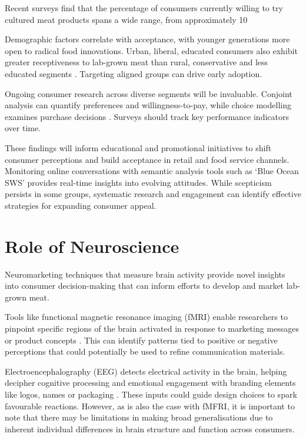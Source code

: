 \documentclass[10pt]{article}
\begin{document}
\begin{sloppypar}
  Recent surveys find that the percentage of consumers currently willing to try cultured meat products spans a wide range, from approximately 10%

  Demographic factors correlate with acceptance, with younger generations more open to radical food innovations. Urban, liberal, educated consumers also exhibit greater receptiveness to lab-grown meat than rural, conservative and less educated segments \citep{circus_exploring_2018}. Targeting aligned groups can drive early adoption.

  Ongoing consumer research across diverse segments will be invaluable. Conjoint analysis can quantify preferences and willingness-to-pay, while choice modelling examines purchase decisions \citep{wilks_attitudes_2017}. Surveys should track key performance indicators over time.

  These findings will inform educational and promotional initiatives to shift consumer perceptions and build acceptance in retail and food service channels. Monitoring online conversations with semantic analysis tools such as ‘Blue Ocean SWS’ provides real-time insights into evolving attitudes. While scepticism persists in some groups, systematic research and engagement can identify effective strategies for expanding consumer appeal.

  \section{Role of Neuroscience}
  \label{sec:role-of-neuroscience}

  Neuromarketing techniques that measure brain activity provide novel insights into consumer decision-making that can inform efforts to develop and market lab-grown meat.

  Tools like functional magnetic resonance imaging (fMRI) enable researchers to pinpoint specific regions of the brain activated in response to marketing messages or product concepts \citep{bryant_consumer_2018}. This can identify patterns tied to positive or negative perceptions that could potentially be used to refine communication materials.

  Electroencephalography (EEG) detects electrical activity in the brain, helping decipher cognitive processing and emotional engagement with branding elements like logos, names or packaging \citep{khushaba_consumer_2013}. These inputs could guide design choices to spark favourable reactions. However, as is also the case with fMFRI, it is important to note that there may be limitations in making broad generalisations due to inherent individual differences in brain structure and function across consumers.


\end{sloppypar}
\end{document}
